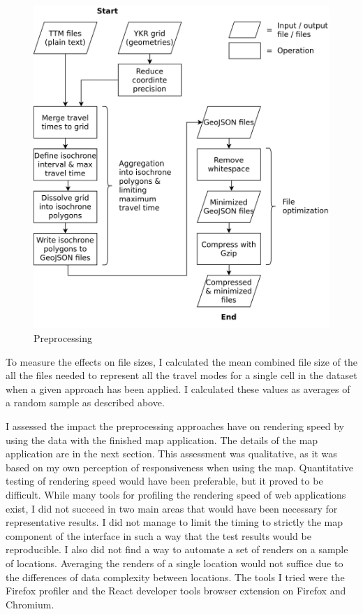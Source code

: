 \begin{figure}[H]
	\centering
	\includegraphics[width=\diagramwidth]{visual/figures/diagrams/preprocessing.png}
	\caption{Preprocessing}
	\label{fig:preprocessing}
\end{figure}

To measure the effects on file sizes,
I calculated the mean combined file size of the all the files needed to represent
all the travel modes for a single cell in the dataset
when a given approach has been applied.
I calculated these values as averages of a random sample as described above.

I assessed the impact the preprocessing approaches have on rendering speed
by using the data with the finished map application.
The details of the map application are in the next section.
This assessment was qualitative,
as it was based on my own perception of responsiveness when using the map.
Quantitative testing of rendering speed would have been preferable,
but it proved to be difficult.
While many tools for profiling the rendering speed of web applications exist,
I did not succeed in two main areas
that would have been necessary for representative results.
I did not manage to limit the timing to strictly the map
component of the interface in such a way that
the test results would be reproducible.
I also did not find a way to automate a set of renders
on a sample of locations.
Averaging the renders of a single location would not suffice
due to the differences of data complexity between locations.
The tools I tried were the Firefox profiler \parencite{firefoxprofiler}
and the React developer tools browser extension \parencite{reactdevtools}
on Firefox and Chromium. %

